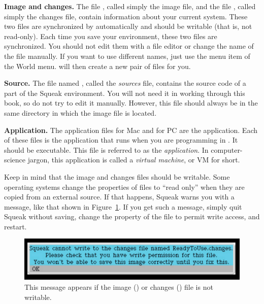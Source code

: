 \documentclass[a4paper,10pt,twoside]{book}
\begin{document}
\begin{description}
\item{\textbf{Image and changes.}} The file , called simply the image file, and the file 
, called simply the changes file, contain information about your current 
\Squeak system. These two files are synchronized by \Squeak automatically and should be 
writable (that is, not read-only). Each time you save your environment, these two files are 
synchronized. You should not edit them with a file editor or change the name of the file 
manually. If you want to use different names, just use the  menu item of the 
World menu. \Squeak will then create a new pair of files for you. 

\item{\textbf{Source.}} The file named , called the \emph{sources} file, contains the source code 
of a part of the Squeak environment. You will not need it in working through this book, so 
do not try to edit it manually. However, this file should always be in the same directory in 
which the image file is located. 

\item{\textbf{Application.}} The application files  for Mac and  for PC are the \Squeak 
application. Each of these files is the application that runs when you are programming in 
\Squeak. It should be executable. This file is referred to as the \Squeak \emph{application}. In computer-science 
jargon, this application is called a \emph{virtual machine}, or VM for short. 
\end{description}

Keep in mind that the image and changes files should be writable. Some operating systems 
change the properties of files to “read only” when they are copied from an external source. If 
that happens, Squeak warns you with a message, like that shown in Figure~\ref{fig:readonlyfile}. If you get such 
a message, simply quit Squeak without saving, change the property of the file to permit write 
access, and restart. 

\begin{figure}[!h]\centerline{\includegraphics[width=\linewidth]{17-changesNotWritable}}\caption{This message appears if the image () or changes () file is not writable.\label{fig:readonlyfile}}
\end{figure}
\end{document}
